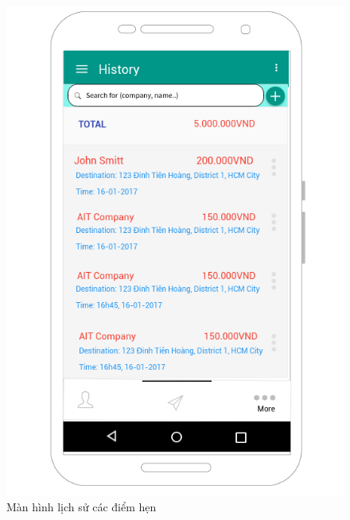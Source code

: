 \documentclass[a4paper]{article}
\begin{document}
\begin{figure}[h]
    \includegraphics[scale=0.6]{Mockup/HI_history}
    \centering
    \caption{Màn hình lịch sử các điểm hẹn}
    \label{fig:HI_history}
\end{figure}
\end{document}
